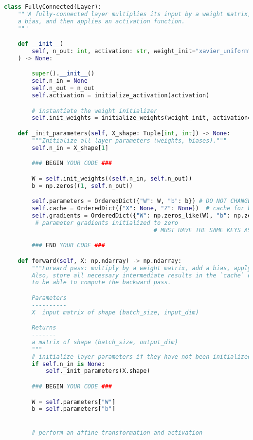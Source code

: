 \begin{lstlisting}[language=Python]
class FullyConnected(Layer):
    """A fully-connected layer multiplies its input by a weight matrix, adds
    a bias, and then applies an activation function.
    """

    def __init__(
        self, n_out: int, activation: str, weight_init="xavier_uniform"
    ) -> None:

        super().__init__()
        self.n_in = None
        self.n_out = n_out
        self.activation = initialize_activation(activation)

        # instantiate the weight initializer
        self.init_weights = initialize_weights(weight_init, activation=activation)

    def _init_parameters(self, X_shape: Tuple[int, int]) -> None:
        """Initialize all layer parameters (weights, biases)."""
        self.n_in = X_shape[1]

        ### BEGIN YOUR CODE ###

        W = self.init_weights((self.n_in, self.n_out))
        b = np.zeros((1, self.n_out))

        self.parameters = OrderedDict({"W": W, "b": b}) # DO NOT CHANGE THE KEYS
        self.cache = OrderedDict({"X": None, "Z": None})  # cache for backprop
        self.gradients = OrderedDict({"W": np.zeros_like(W), "b": np.zeros_like(b)})
         # parameter gradients initialized to zero
                                           # MUST HAVE THE SAME KEYS AS `self.parameters`

        ### END YOUR CODE ###

    def forward(self, X: np.ndarray) -> np.ndarray:
        """Forward pass: multiply by a weight matrix, add a bias, apply activation.
        Also, store all necessary intermediate results in the `cache` dictionary
        to be able to compute the backward pass.

        Parameters
        ----------
        X  input matrix of shape (batch_size, input_dim)

        Returns
        -------
        a matrix of shape (batch_size, output_dim)
        """
        # initialize layer parameters if they have not been initialized
        if self.n_in is None:
            self._init_parameters(X.shape)

        ### BEGIN YOUR CODE ###

        W = self.parameters["W"]
        b = self.parameters["b"]


        # perform an affine transformation and activation


\end{lstlisting}
